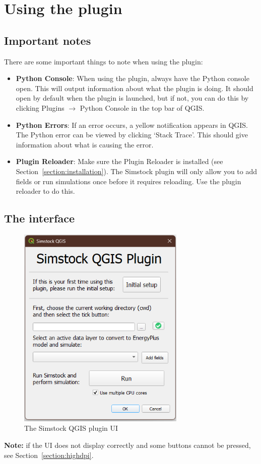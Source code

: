 \documentclass{article}
\begin{document}
\clearpage
\section{Using the plugin}
\subsection{Important notes}
There are some important things to note when using the plugin:
\begin{itemize}
    \item \textbf{Python Console}: When using the plugin, always have the Python console open. This will output information about what the plugin is doing. It should open by default when the plugin is launched, but if not, you can do this by clicking Plugins $\rightarrow$ Python Console in the top bar of QGIS.
    \item \textbf{Python Errors}: If an error occurs, a yellow notification appears in QGIS. The Python error can be viewed by clicking `Stack Trace'. This should give information about what is causing the error.
    \item \textbf{Plugin Reloader}: Make sure the Plugin Reloader is installed (see Section~\ref{section:installation}). The Simstock plugin will only allow you to add fields or run simulations once before it requires reloading. Use the plugin reloader to do this. %
\end{itemize}

\subsection{The interface}
\begin{figure}[h!]
    \centering
    \includegraphics[width=8cm]{Figures/plugin_win11.png}
    \caption{The Simstock QGIS plugin UI}
    \label{fig:pluginui}
\end{figure}
\textbf{Note:} if the UI does not display correctly and some buttons cannot be pressed, see Section~\ref{section:highdpi}.
\end{document}
